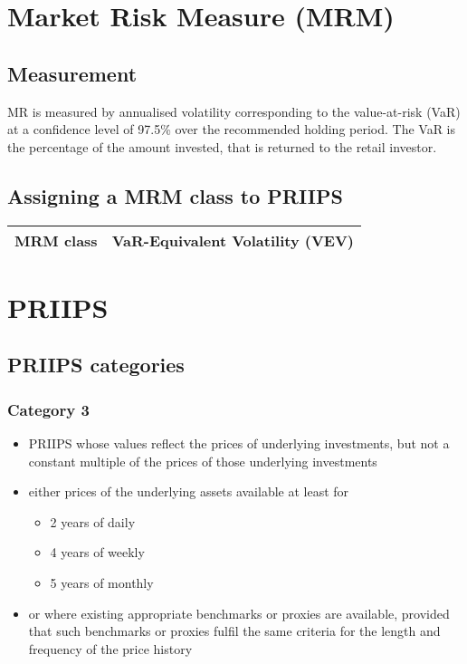 \documentclass{report}
\begin{document}
	
\tableofcontents

\chapter{Market Risk Measure (MRM)}

\section{Measurement}
MR is measured by annualised volatility corresponding to the value-at-risk (VaR) at a confidence level of 97.5\% over the recommended holding period. The VaR is the percentage of the amount invested, that is returned to the retail investor.

\section{Assigning a MRM class to PRIIPS}

\begin{center}
	\begin{longtable}{| p{8cm} | p{9cm}}
		\hline
		\textbf{MRM class} & {VaR-Equivalent Volatility (VEV)}\\
		\hline
	\end{longtable}
\end{center}

\chapter{PRIIPS}

\section{PRIIPS categories}

\subsection{Category 3}
\begin{itemize}
	\item PRIIPS whose values reflect the prices of underlying investments, but not a constant multiple of the prices of those underlying investments
	\item either prices of the underlying assets available at least for
	\begin{itemize}
		\item 2 years of daily 
		\item 4 years of weekly
		\item 5 years of monthly
	\end{itemize}
	\item or where existing appropriate benchmarks or proxies are available, provided that such benchmarks or proxies fulfil the same criteria for the length and frequency of the price history 
\end{itemize}
\end{document}
